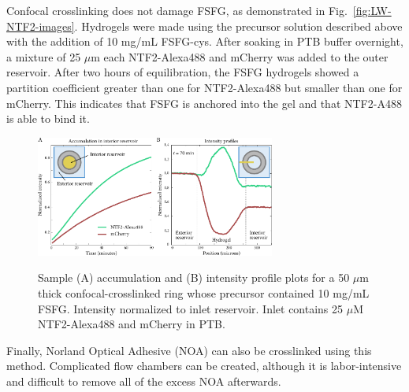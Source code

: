 Confocal crosslinking does not damage FSFG, as demonstrated in Fig.~\ref{fig:LW-NTF2-images}.  Hydrogels were made using the precursor solution described above with the addition of 10 mg/mL FSFG-cys.  After soaking in PTB buffer overnight, a mixture of 25 $\mu$m each NTF2-Alexa488 and mCherry was added to the outer reservoir.  After two hours of equilibration, the FSFG hydrogels showed a partition coefficient greater than one for NTF2-Alexa488 but smaller than one for mCherry.  This indicates that FSFG is anchored into the gel and that NTF2-A488 is able to bind it.

\begin{figure} %
  \centering
  \caption[Influx plots for confocal-crosslinked hydrogel ring.]{Sample (A) accumulation and (B) intensity profile plots for a 50 $\mu$m thick confocal-crosslinked ring whose precursor contained 10 mg/mL FSFG. Intensity normalized to inlet reservoir.  Inlet contains 25 $\mu$M NTF2-Alexa488 and mCherry in PTB.\\}
  \includegraphics[width=0.7\textwidth]{figs/ch03/ring-acc-and-profile}
\label{fig:ring-acc-and-profile}
\end{figure} %

Finally, Norland Optical Adhesive (NOA) can also be crosslinked using this method.  Complicated flow chambers can be created, although it is labor-intensive and difficult to remove all of the excess NOA afterwards.

